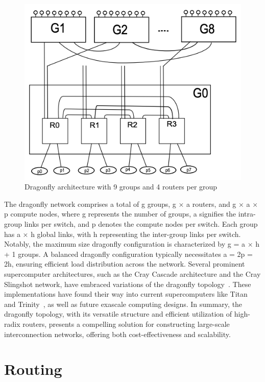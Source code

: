 \begin{figure}[h!]
  \centering
  \includegraphics[width=0.8\columnwidth]{figs/dfly.png}
  \caption{Dragonfly architecture with 9 groups and 4 routers per group}
  \label{fig:dfly}
\end{figure}


The dragonfly network comprises a total of
g groups, g × a routers, and g × a × p compute nodes, where g represents the
number of groups, a signifies the intra-group links per switch, and p
denotes the compute nodes per switch. Each group has a × h global links, with
h representing the inter-group links per switch. Notably, the maximum size
dragonfly configuration is characterized by g = a × h + 1 groups.  A balanced
dragonfly configuration typically necessitates a = 2p = 2h, ensuring efficient
load distribution across the network.  Several prominent supercomputer
architectures, such as the Cray Cascade architecture and the Cray Slingshot
network, have embraced variations of the dragonfly topology~\cite{faanes2012cray, de2020depth}. These
implementations have found their way into current supercomputers like Titan~\cite{titan} and
Trinity~\cite{archer2015trinity}, as well as future exascale computing designs.  In summary, the
dragonfly topology, with its versatile structure and efficient utilization of
high-radix routers, presents a compelling solution for constructing large-scale
interconnection networks, offering both cost-effectiveness and scalability.

\section{Routing}

